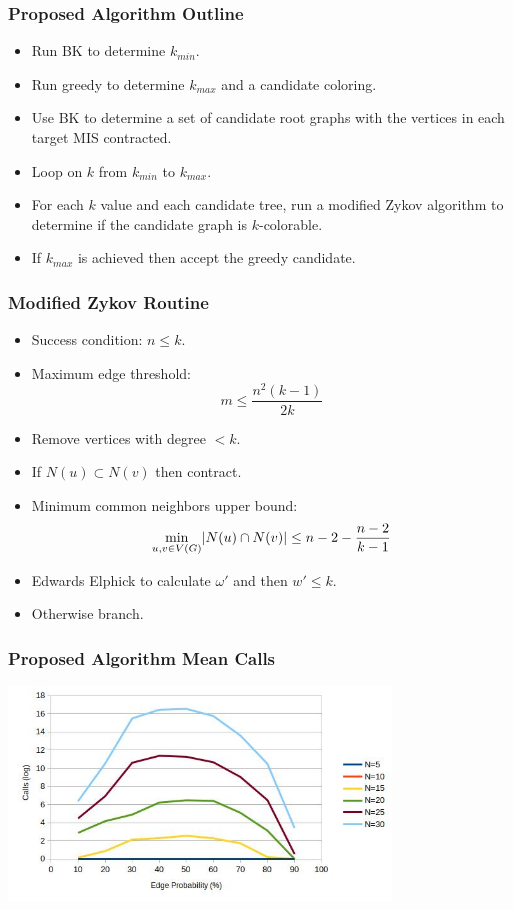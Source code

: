 \documentclass{beamer}
\newcommand{\w}{\omega}
\DeclarePairedDelimiter{\abs}{\lvert}{\rvert}
\begin{document}
\begin{frame}
  \frametitle{Proposed Algorithm Outline}
  \begin{itemize}
  \item Run BK to determine \(k_{min}\).
  \item Run greedy to determine \(k_{max}\) and a candidate coloring.
  \item Use BK to determine a set of candidate root graphs with the vertices in each target MIS contracted.
  \item Loop on \(k\) from \(k_{min}\) to \(k_{max}\).
  \item For each \(k\) value and each candidate tree, run a modified Zykov algorithm to determine if the candidate
    graph is \(k\)-colorable.
  \item If \(k_{max}\) is achieved then accept the greedy candidate.
  \end{itemize}
\end{frame}

\begin{frame}
  \frametitle{Modified Zykov Routine}
  \begin{itemize}
  \item Success condition: \(n\le k\).
  \item Maximum edge threshold:
    \[\displaystyle m\le\frac{n^2(k-1)}{2k}\]
  \item Remove vertices with degree \(<k\).
  \item If \(N(u)\subset N(v)\) then contract.
  \item Minimum common neighbors upper bound:
    \[\displaystyle\min_{u,v\in V(G)}\abs{N(u)\cap N(v)}\le n-2-\frac{n-2}{k-1}\]
  \item Edwards Elphick to calculate \(\w'\) and then \(w'\le k\).
  \item Otherwise branch.
  \end{itemize}
\end{frame}

\begin{frame}
  \frametitle{Proposed Algorithm Mean Calls}
  \begin{center}
    \includegraphics[width=4in]{../final/qz_calls}
  \end{center}
\end{frame}
\end{document}
